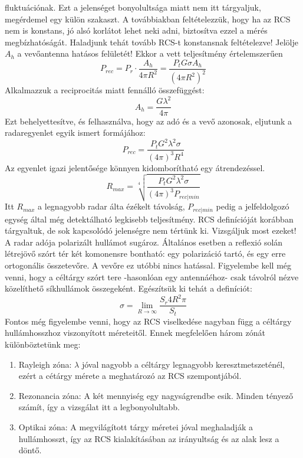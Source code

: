 \documentclass{article}
\begin{document}
fluktuációnak. Ezt a jelenséget bonyolultsága miatt nem itt tárgyaljuk, megérdemel egy külön szakaszt. A továbbiakban
feltételezzük, hogy ha az RCS nem is konstans, jó alsó korlátot lehet neki adni, biztosítva ezzel a mérés
megbízhatóságát. Haladjunk tehát tovább RCS-t konstansnak feltételezve!
\quad Jelölje $A_h$ a vevőantenna hatásos felületét! Ekkor a vett teljesítmény értelemszerűen
    \begin{equation}
        P_{rec}=P_r \cdot \frac{A_h}{4 \pi R^2}=\frac{P_t G \sigma A_h}{(4 \pi R^2)^2}
    \end{equation}
Alkalmazzuk a reciprocitás miatt fennálló összefüggést:
    \begin{equation}
        A_h=\frac{G \lambda^2}{4 \pi}
    \end{equation}
Ezt behelyettesítve, és felhasználva, hogy az adó és a vevő azonosak, eljutunk a radaregyenlet egyik ismert formájához:
    \begin{equation}
        P_{rec}=\frac{P_t G^2 \lambda^2 \sigma }{(4 \pi)^3 R^4}
    \end{equation}
Az egyenlet igazi jelentősége könnyen kidomborítható egy átrendezéssel.
    \begin{equation}
        R_{max}=\sqrt[4]{\frac{P_t G^2 \lambda^2 \sigma }{(4 \pi)^3 P_{rec|min}}}
    \end{equation}
Itt $R_{max}$ a legnagyobb radar álta ézékelt távolság, $P_{rec|min}$ pedig a jelfeldolgozó egység által még detektálható legkisebb teljesítmény.
RCS definícióját korábban tárgyaltuk, de sok kapcsolódó jelenségre nem tértünk ki. Vizsgáljuk most ezeket!\newline
\quad A radar adója polarizált hullámot sugároz. Általános esetben a reflexió solán létrejövő szórt tér két komonensre
bontható: egy polarizáció tartó, és egy erre ortogonális összetevőre. A vevőre ez utóbbi nincs hatással. Figyelembe kell
még venni, hogy a céltárgy szórt tere -hasonlóan egy antennáéhoz- csak távolról nézve közelíthető síkhullámok
összegeként. Egészítsük ki tehát a definíciót:
    \begin{equation}
        \sigma=\lim_{R \to \infty} \frac{S_r 4 R^2 \pi}{S_t}
    \end{equation}
Fontos még figyelembe venni, hogy az RCS viselkedése nagyban függ a céltárgy hullámhosszhoz viszonyított méreteitől.
Ennek megfelelően három zónát különböztetünk meg:
    \begin{enumerate}
        \item Rayleigh zóna: $\lambda$ jóval nagyobb a céltárgy legnagyobb keresztmetszeténél, ezért a cétárgy mérete a
            meghatározó az RCS szempontjából.
        \item Rezonancia zóna: A két mennyiség egy nagyságrendbe esik. Minden tényező számít, így a vizsgálat itt a
            legbonyolultabb.
        \item Optikai zóna: A megvilágított tárgy méretei jóval meghaladják a hullámhosszt, így az RCS kialakításában az
            irányultság és az alak lesz a döntő.
    \end{enumerate}
\end{document}
